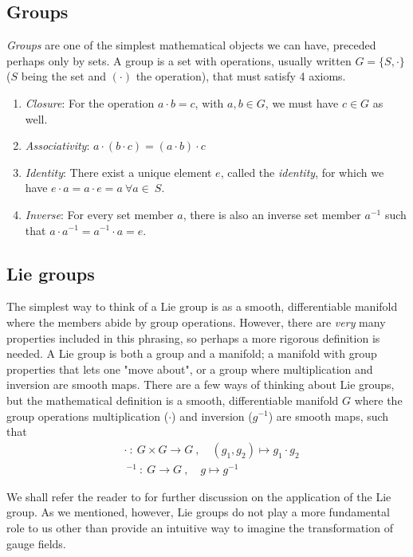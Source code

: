 \documentclass[10pt,twoside]{report}
\begin{document}
\begin{appendices}
	\subsection{Groups}
	\emph{Groups} are one of the simplest mathematical objects we can have, preceded perhaps only by sets. A group is a set with operations, usually written $G=\{S,\cdot\}$ ($S$ being the set and $(\cdot)$ the operation), that must satisfy 4 axioms.
	
	\begin{enumerate}
		\item \emph{Closure}: For the operation $a\cdot b=c$, with $a,b\in G$, we must have $c\in G$ as well.
		\item \emph{Associativity}: $a\cdot(b\cdot c) = (a\cdot b)\cdot c$
		\item \emph{Identity}: There exist a unique element $e$, called the \emph{identity}, for which we have $e\cdot a= a\cdot e = a \:\forall a\in\: S$.
		\item \emph{Inverse}: For every set member $a$, there is also an inverse set member $a^{-1}$ such that $a\cdot a^{-1} = a^{-1}\cdot a = e$.
	\end{enumerate}
	
	\subsection{Lie groups}
	The simplest way to think of a Lie group is as a smooth, differentiable manifold where the members abide by group operations. However, there are \emph{very} many properties included in this phrasing, so perhaps a more rigorous definition is needed. A Lie group is both a group and a manifold; a manifold with group properties that lets one "move about", or a group where multiplication and inversion are smooth maps. There are a few ways of thinking about Lie groups, but the mathematical definition is a smooth, differentiable manifold $G$ where the group operations multiplication ($\cdot$) and inversion ($g^{-1}$) are smooth maps, such that \cite{Nakahara}\\
	
	\begin{align}
		&\cdot \: : \: G\times G \rightarrow G\:,\quad (g_1,g_2)\mapsto g_1\cdot g_2 \\
		&\:^{-1} \: : \: G \rightarrow G\:,\quad g\mapsto g^{-1}
	\end{align}
	
	We shall refer the reader to \cite{Nakahara} for further discussion on the application of the Lie group. As we mentioned, however, Lie groups do not play a more fundamental role to us other than provide an intuitive way to imagine the transformation of gauge fields.
	
	\end{appendices}
	
\end{document}
